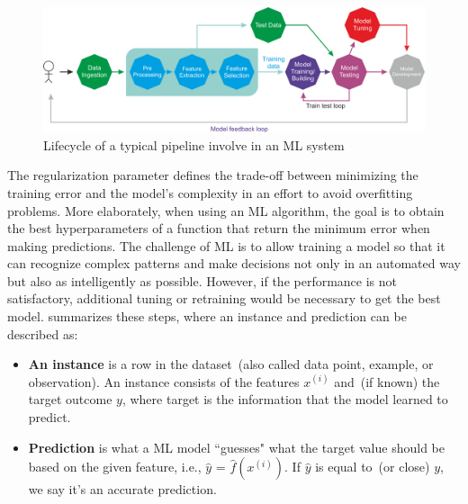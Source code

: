 \begin{figure}[h]
	\centering
	\includegraphics[scale=0.6]{images/B08452_01_02.png}
	\caption{Lifecycle of a typical  pipeline involve in an ML system~\cite{karimScalaML2019}} 
	\label{fig:ml_pipeline}
\end{figure}

\hspace*{3.5mm} The regularization parameter defines the trade-off between minimizing the training error and the model's complexity in an effort to avoid overfitting problems. More elaborately, when using an ML algorithm, the goal is to obtain the best hyperparameters of a function that return the minimum error when making predictions. 
The challenge of ML is to allow training a model so that it can recognize complex patterns and make decisions not only in an automated way but also as intelligently as possible. 
However, if the performance is not satisfactory, additional tuning or retraining would be necessary to get the best model. %
 summarizes these steps, where an instance and prediction can be described as: 

\begin{itemize}[noitemsep]
    \item \textbf{An instance} is a row in the dataset~(also called data point, example, or observation). An instance consists of the features $x^{(i)}$ and~(if known) the target outcome ${y}$, where target is the information that the model learned to predict.

    \item \textbf{Prediction} is what a ML model ``guesses" what the target value should be based on the given feature, i.e., $\hat{y}$ = $\hat{f}\left(x^{(i)}\right)$. If $\hat{y}$ is equal to~(or close) ${y}$, we say it's an accurate prediction.   
\end{itemize}

